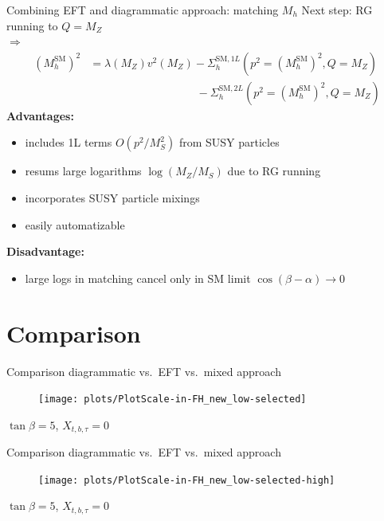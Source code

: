 \documentclass[hyperref={pdfpagelabels=false},ngerman]{beamer}
\renewcommand{\emph}{\textbf}
\newcommand{\SM}{\ensuremath{\text{SM}}}
\begin{document}
\begin{frame}{Combining EFT and diagrammatic approach: matching $M_h$}
  Next step: RG running to $Q = M_Z$\\
  $\Rightarrow$
  \begin{align*}
    (M_h^{\SM})^2 &= \lambda(M_Z) v^2(M_Z) - \Sigma^{\SM,1L}_h(p^2 = (M_h^{\SM})^2,Q = M_Z) \\
    &\phantom{=\; \lambda(M_Z) v^2(M_Z)} - \Sigma^{\SM,2L}_h(p^2 = (M_h^{\SM})^2,Q = M_Z)
  \end{align*}
  \emph{Advantages:}
  \begin{itemize}
  \item includes 1L terms $O(p^2/M_S^2)$ from SUSY particles
  \item resums large logarithms $\log(M_Z/M_S)$ due to RG running
  \item incorporates SUSY particle mixings
  \item easily automatizable
  \end{itemize}
  \emph{Disadvantage:}
  \begin{itemize}
  \item large logs in matching cancel only in SM limit $\cos(\beta - \alpha) \rightarrow 0$
  \end{itemize}
\end{frame}


\section{Comparison}

\begin{frame}{Comparison diagrammatic vs.\ EFT vs.\ mixed approach}
  \begin{figure}
    \centering
    \texttt{[image: plots/PlotScale-in-FH\_new\_low-selected]}
  \end{figure}
  $\tan\beta = 5$, $X_{t,b,\tau} = 0$
\end{frame}

\begin{frame}{Comparison diagrammatic vs.\ EFT vs.\ mixed approach}
  \begin{figure}
    \centering
    \texttt{[image: plots/PlotScale-in-FH\_new\_low-selected-high]}
  \end{figure}
  $\tan\beta = 5$, $X_{t,b,\tau} = 0$
\end{frame}

\end{document}
